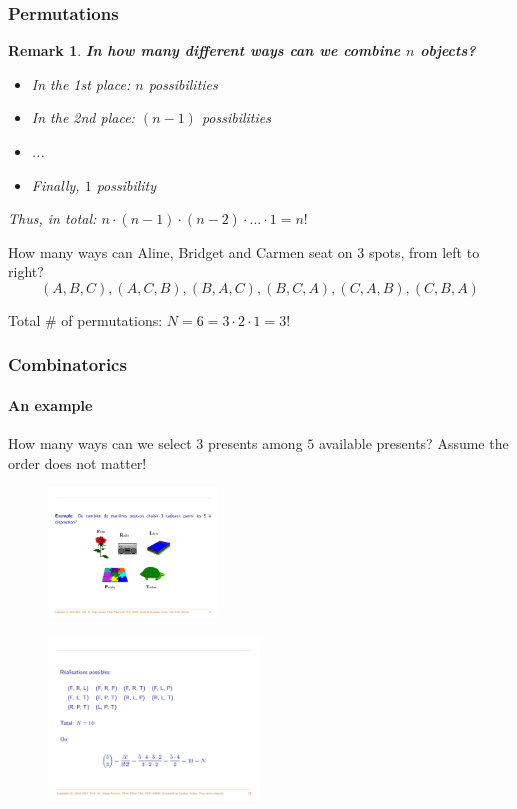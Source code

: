 \documentclass[notes=show, handout]{beamer}\usepackage[]{graphicx}\usepackage[]{color}
\newtheorem{remark}{Remark}[section]
\begin{document}
\begin{frame}
\frametitle{Permutations}
\begin{remark}
\textbf{In how many different ways can we combine $n$ objects?}
\begin{itemize}
\item In the 1st place: $n$ possibilities
\item In the 2nd place: $(n-1)$ possibilities
\item ...
\item Finally, $1$ possibility
\end{itemize}
Thus, in total: $ n\cdot(n-1)\cdot(n-2)\cdot...\cdot1 = n !$
\end{remark}
\pause
\begin{example}
How many ways can Aline, Bridget and Carmen seat on 3 spots, from left to right?
$$
(A, B, C), (A, C, B), (B, A, C), (B, C, A), (C, A, B), (C, B, A)
$$

Total $\#$ of permutations: $N = 6 = 3 \cdot 2 \cdot 1 = 3!$
\end{example}
\end{frame}


\begin{frame}
\frametitle{Combinatorics}
\framesubtitle{An example}
\begin{example}
\small{How many ways can we select $3$ presents among $5$ available presents?
Assume the order does not matter!}

\begin{figure}[h!]
\includegraphics[width=0.4\textwidth,height=0.35\textheight]{gifts.pdf}
\end{figure}

\begin{figure}[h!]
\includegraphics[width=0.5\textwidth,height=0.2\textheight]{outcomes.pdf}
\end{figure}
\end{example}

\end{frame}
\end{document}
